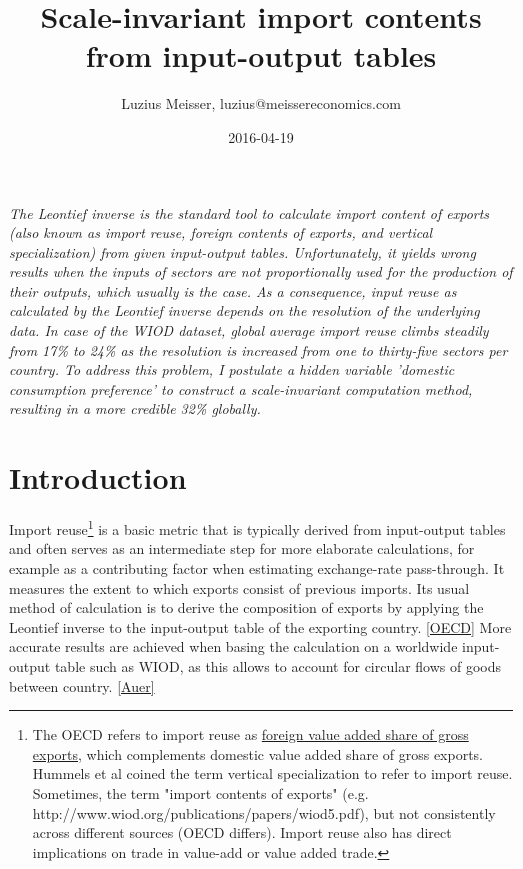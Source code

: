 \documentclass{paper}
\begin{document}
\title{Scale-invariant import contents from input-output tables}


\author{Luzius Meisser, luzius@meissereconomics.com}

\date{2016-04-19}

\maketitle

\emph{The Leontief inverse is the standard tool to calculate import content of exports (also known as import reuse, foreign contents of exports, and vertical specialization) from given input-output tables. Unfortunately, it yields wrong results when the inputs of sectors are not proportionally used for the production of their outputs, which usually is the case. As a consequence, input reuse as calculated by the Leontief inverse depends on the resolution of the underlying data. In case of the WIOD dataset, global average import reuse climbs steadily from 17\% to 24\% as the resolution is increased from one to thirty-five sectors per country. To address this problem, I postulate a hidden variable 'domestic consumption preference' to construct a scale-invariant computation method, resulting in a more credible 32\% globally.}

\section{Introduction}
Import reuse\footnote{The OECD refers to import reuse as \href{http://www.oecd-ilibrary.org/trade/data/oecd-wto-statistics-on-trade-in-value-added_data-00648-en}{foreign value added share of gross exports}, which complements domestic value added share of gross exports. Hummels et al coined the term vertical specialization to refer to import reuse.\cite{hummels2001nature} Sometimes, the term "import contents of exports" (e.g. http://www.wiod.org/publications/papers/wiod5.pdf), but not consistently across different sources (OECD differs). Import reuse also has direct implications on trade in value-add or value added trade.} is a basic metric that is typically derived from input-output tables and often serves as an intermediate step for more elaborate calculations, for example as a contributing factor when estimating exchange-rate pass-through. It measures the extent to which exports consist of previous imports. Its usual method of calculation is to derive the composition of exports by applying the Leontief inverse to the input-output table of the exporting country. \ref{OECD} More accurate results are achieved when basing the calculation on a worldwide input-output table such as WIOD, as this allows to account for circular flows of goods between country. \ref{Auer}
\end{document}
